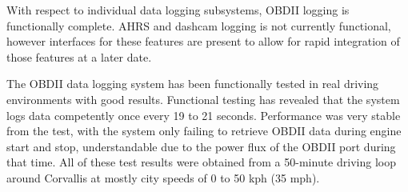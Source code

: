 \documentclass[onecolumn, draftclsnofoot,10pt, compsoc]{IEEEtran}
\begin{document}
With respect to individual data logging subsystems, OBDII logging is functionally complete. AHRS and dashcam logging is not currently functional, however interfaces for these features are present to allow for rapid integration of those features at a later date.\par
The OBDII data logging system has been functionally tested in real driving environments with good results. Functional testing has revealed that the system logs data competently once every 19 to 21 seconds. Performance was very stable from the test, with the system only failing to retrieve OBDII data during engine start and stop, understandable due to the power flux of the OBDII port during that time. All of these test results were obtained from a 50-minute driving loop around Corvallis at mostly city speeds of 0 to 50 kph (35 mph).\par
	
\end{document}
